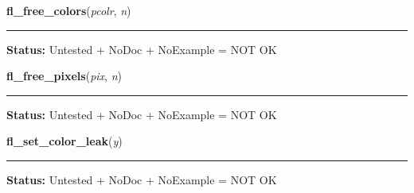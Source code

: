     \vspace{0.5ex}

\hspace{.8\funcindent}\begin{boxedminipage}{\funcwidth}

    \raggedright \textbf{fl\_free\_colors}(\textit{pcolr}, \textit{n})

    \vspace{-1.5ex}

    \rule{\textwidth}{0.5\fboxrule}
\setlength{\parskip}{2ex}
\setlength{\parskip}{1ex}
\textbf{Status:} Untested + NoDoc + NoExample = NOT OK



    \end{boxedminipage}

    \label{xformslib:library:fl_free_pixels}

    \vspace{0.5ex}

\hspace{.8\funcindent}\begin{boxedminipage}{\funcwidth}

    \raggedright \textbf{fl\_free\_pixels}(\textit{pix}, \textit{n})

    \vspace{-1.5ex}

    \rule{\textwidth}{0.5\fboxrule}
\setlength{\parskip}{2ex}
\setlength{\parskip}{1ex}
\textbf{Status:} Untested + NoDoc + NoExample = NOT OK



    \end{boxedminipage}

    \label{xformslib:library:fl_set_color_leak}

    \vspace{0.5ex}

\hspace{.8\funcindent}\begin{boxedminipage}{\funcwidth}

    \raggedright \textbf{fl\_set\_color\_leak}(\textit{y})

    \vspace{-1.5ex}

    \rule{\textwidth}{0.5\fboxrule}
\setlength{\parskip}{2ex}
\setlength{\parskip}{1ex}
\textbf{Status:} Untested + NoDoc + NoExample = NOT OK



    \end{boxedminipage}

